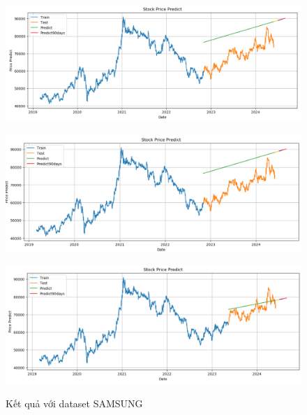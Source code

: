 \documentclass[conference]{IEEEtran}
\begin{document}
\begin{figure}[H]
    \centering
    \begin{minipage}{0.15\textwidth}
    \centering
    \includegraphics[width=1\textwidth]{Image/Linear/Linear_SAMSUNG_6_4.png}
   
    \label{fig:1}
    \end{minipage}%
    \begin{minipage}{0.15\textwidth}
    \centering
    \includegraphics[width=1\textwidth]{Image/Linear/Linear_SAMSUNG_7_3.png}
  
    \label{fig:2}
    \end{minipage}%
    \begin{minipage}{0.15\textwidth}
    \centering
    \includegraphics[width=1\textwidth]{Image/Linear/Linear_SAMSUNG_8_2.png}

    \label{fig:3}
    \end{minipage}
    \caption{Kết quả với dataset SAMSUNG}
\end{figure}
\end{document}
